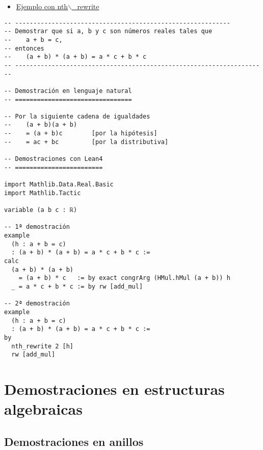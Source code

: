 \begin{itemize}
\item \href{./src/Basicos/Ejemplo\_con\_nth\_rewrite.lean}{Ejemplo con nth$\backslash$\_rewrite}
\end{itemize}
\begin{verbatim}
-- -----------------------------------------------------------
-- Demostrar que si a, b y c son números reales tales que
--    a + b = c,
-- entonces
--    (a + b) * (a + b) = a * c + b * c
-- ---------------------------------------------------------------------

-- Demostración en lenguaje natural
-- ================================

-- Por la siguiente cadena de igualdades
--    (a + b)(a + b)
--    = (a + b)c        [por la hipótesis]
--    = ac + bc         [por la distributiva]

-- Demostraciones con Lean4
-- ========================

import Mathlib.Data.Real.Basic
import Mathlib.Tactic

variable (a b c : ℝ)

-- 1ª demostración
example
  (h : a + b = c)
  : (a + b) * (a + b) = a * c + b * c :=
calc
  (a + b) * (a + b)
    = (a + b) * c   := by exact congrArg (HMul.hMul (a + b)) h
  _ = a * c + b * c := by rw [add_mul]

-- 2ª demostración
example
  (h : a + b = c)
  : (a + b) * (a + b) = a * c + b * c :=
by
  nth_rewrite 2 [h]
  rw [add_mul]
\end{verbatim}

\section{Demostraciones en estructuras algebraicas}
\label{sec:orgcf25919}

\subsection{Demostraciones en anillos}
\label{sec:org931e098}

